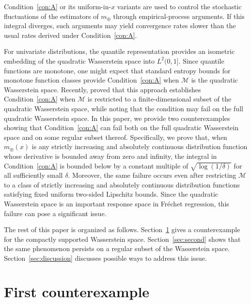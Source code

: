 \documentclass[11pt]{article}
\numberwithin{equation}{section}
\begin{document}
Condition~\ref{con:A} or its uniform-in-$x$ variants are used to
control the stochastic fluctuations of the estimators of $m_\oplus$ through
empirical-process arguments. If this integral diverges, such arguments may yield convergence rates slower than the usual rates derived under Condition~\ref{con:A}.

For univariate distributions, the quantile representation provides an isometric embedding
of the quadratic Wasserstein space into \(L^2(0,1]\). Since
quantile functions are monotone, one might 
expect that standard entropy bounds for monotone function classes
provide Condition~\ref{con:A} when $\mathcal{M}$ is the quadratic Wasserstein space. Recently, \citet{PetersenMuller2026} proved that this approach establishes Condition~\ref{con:A} when $\mathcal{M}$ is restricted to a finite-dimensional subset of the quadratic Wasserstein space, while noting that the condition may fail on the full quadratic Wasserstein space. In this paper, we provide two counterexamples showing that Condition~\ref{con:A} can fail both on the full quadratic Wasserstein space and on some regular subset thereof. Specifically, we prove that, when $m_\oplus(x)$ is any strictly increasing and absolutely continuous distribution function whose derivative is bounded away
from zero and infinity, the integral in Condition~\ref{con:A} is bounded below
by a constant multiple of \(\sqrt{\log(1/\delta)}\) for all sufficiently small \(\delta\). Moreover, the same failure occurs even after restricting $\mathcal{M}$ to a class of strictly increasing and absolutely continuous distribution functions satisfying fixed uniform two-sided Lipschitz bounds. Since the quadratic Wasserstein space is an important response space in Fr\'echet regression, this failure can pose a significant issue.

The rest of this paper is organized as follows.
Section~\ref{sec:first} gives a counterexample for the compactly
supported Wasserstein space. Section~\ref{sec:second} shows that the same
phenomenon persists on a regular subset of the Wasserstein space. Section~\ref{sec:discussion} discusses possible ways to address this issue.

\section{First counterexample}\label{sec:first}
\end{document}
